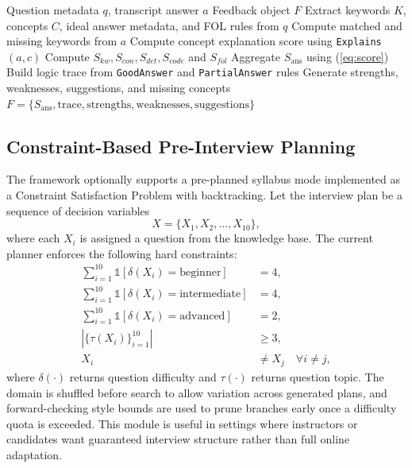 \documentclass[conference]{IEEEtran}
\begin{document}
\begin{algorithm}[t]
\caption{Logic-Grounded Answer Evaluation}
\label{alg:evaluation}
\begin{algorithmic}[1]
\Require Question metadata $q$, transcript answer $a$
\Ensure Feedback object $F$
\State Extract keywords $K$, concepts $C$, ideal answer metadata, and FOL rules from $q$
\State Compute matched and missing keywords from $a$
    \State Compute concept explanation score using \texttt{Explains}$(a,c)$
\EndFor
\State Compute $S_{kw}, S_{con}, S_{det}, S_{code}$ and $S_{fol}$
\State Aggregate $S_{\mathrm{ans}}$ using (\ref{eq:score})
\State Build logic trace from \texttt{GoodAnswer} and \texttt{PartialAnswer} rules
\State Generate strengths, weaknesses, suggestions, and missing concepts
\State \Return $F = \{S_{\mathrm{ans}}, \text{trace}, \text{strengths}, \text{weaknesses}, \text{suggestions}\}$
\end{algorithmic}
\end{algorithm}

\subsection{Constraint-Based Pre-Interview Planning}
The framework optionally supports a pre-planned syllabus mode implemented as a Constraint Satisfaction Problem with backtracking. Let the interview plan be a sequence of decision variables
\begin{equation}
X = \{X_1, X_2, \dots, X_{10}\},
\end{equation}
where each $X_i$ is assigned a question from the knowledge base. The current planner enforces the following hard constraints:
\begin{align}
\sum_{i=1}^{10}\mathbb{1}[\delta(X_i)=\text{beginner}] &= 4, \nonumber\\
\sum_{i=1}^{10}\mathbb{1}[\delta(X_i)=\text{intermediate}] &= 4, \nonumber\\
\sum_{i=1}^{10}\mathbb{1}[\delta(X_i)=\text{advanced}] &= 2, \label{eq:csp}\\
|\{\tau(X_i)\}_{i=1}^{10}| &\geq 3, \nonumber\\
X_i &\neq X_j \quad \forall i \neq j, \nonumber
\end{align}
where $\delta(\cdot)$ returns question difficulty and $\tau(\cdot)$ returns question topic. The domain is shuffled before search to allow variation across generated plans, and forward-checking style bounds are used to prune branches early once a difficulty quota is exceeded. This module is useful in settings where instructors or candidates want guaranteed interview structure rather than full online adaptation.
\end{document}
